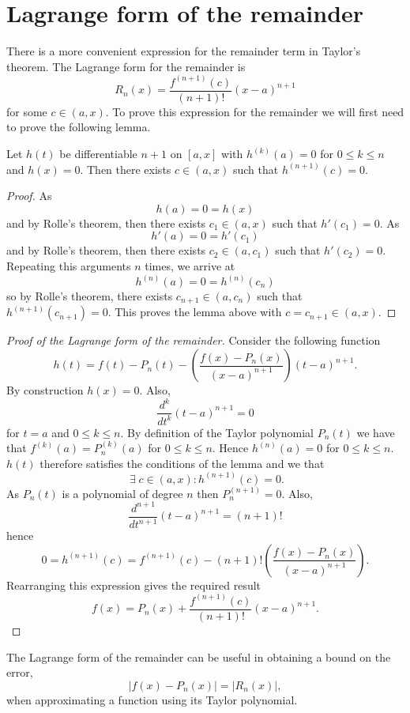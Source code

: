 \section{Lagrange form of the remainder}

There is a more convenient expression for the remainder term in Taylor's theorem. The Lagrange form for the remainder is \[R_n(x)=\dfrac{f^{(n+1)}(c)}{(n+1)!}(x-a)^{n+1}\] for some $c\in(a,x)$. To prove this expression for the remainder we will first need to prove the following lemma.

\begin{lemma}
    Let $h(t)$ be differentiable $n+1$ on $[a,x]$ with $h^{(k)}(a)=0$ for $0\leq k\leq n$ and $h(x)=0$. Then there exists $c\in(a,x)$ such that $h^{(n+1)}(c)=0$.
\end{lemma}

\begin{proof}
    As \[h(a)=0=h(x)\] and by Rolle's theorem, then there exists $c_1\in(a,x)$ such that $h'(c_1)=0$. As \[h'(a)=0=h'(c_1)\] and by Rolle's theorem, then there exists $c_2\in(a,c_1)$ such that $h'(c_2)=0$. Repeating this arguments $n$ times, we arrive at \[h^{(n)}(a)=0=h^{(n)}(c_n)\] so by Rolle's theorem, there exists $c_{n+1}\in(a,c_n)$ such that $h^{(n+1)}(c_{n+1})=0$. This proves the lemma above with $c=c_{n+1}\in(a,x)$.
\end{proof}

\begin{proof}[Proof of the Lagrange form of the remainder]
    Consider the following function \[h(t)=f(t)-P_n(t)-\left(\dfrac{f(x)-P_n(x)}{(x-a)^{n+1}}\right)(t-a)^{n+1}.\] By construction $h(x)=0$. Also, \[\dfrac{d^k}{dt^k}(t-a)^{n+1}=0\] for $t=a$ and $0\leq k\leq n$. By definition of the Taylor polynomial $P_n(t)$ we have that $f^{(k)}(a)=P_n^{(k)}(a)$ for $0\leq k\leq n$. Hence $h^{(n)}(a)=0$ for $0\leq k\leq n$. $h(t)$ therefore satisfies the conditions of the lemma and we that \[\;\exists\;c\in(a,x):h^{(n+1)}(c)=0.\] As $P_n(t)$ is a polynomial of degree $n$ then $P_n^{(n+1)}=0$. Also, \[\dfrac{d^{n+1}}{dt^{n+1}}(t-a)^{n+1}=(n+1)!\] hence \[0=h^{(n+1)}(c)=f^{(n+1)}(c)-(n+1)!\left(\dfrac{f(x)-P_n(x)}{(x-a)^{n+1}}\right).\] Rearranging this expression gives the required result \[f(x)=P_n(x)+\dfrac{f^{(n+1)}(c)}{(n+1)!}(x-a)^{n+1}.\]
\end{proof}

The Lagrange form of the remainder can be useful in obtaining a bound on the error, \[|f(x)-P_n(x)|=|R_n(x)|,\] when approximating a function using its Taylor polynomial.

